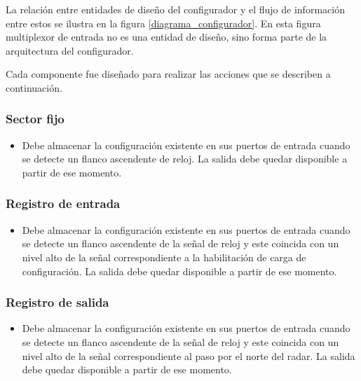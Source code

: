 La relación entre entidades de diseño del configurador y el flujo de información entre estos se ilustra en la figura \ref{diagrama_configurador}. En esta figura multiplexor de entrada no es una entidad de diseño, sino forma parte de la arquitectura del configurador.

Cada componente fue diseñado para realizar las acciones que se describen a continuación.

\subsubsection{Sector fijo}
\begin{itemize}
\item Debe almacenar la configuración existente en sus puertos de entrada cuando se detecte un flanco ascendente de reloj. La salida debe quedar disponible a partir de ese momento.
\end{itemize}

\subsubsection{Registro de entrada}
\begin{itemize}
\item Debe almacenar la configuración existente en sus puertos de entrada cuando se detecte un flanco ascendente de la señal de reloj y este coincida con un nivel alto de la señal correspondiente a la habilitación de carga de configuración. La salida debe quedar disponible a partir de ese momento.
\end{itemize}

\subsubsection{Registro de salida}
\begin{itemize}
\item Debe almacenar la configuración existente en sus puertos de entrada cuando se detecte un flanco ascendente de la señal de reloj y este coincida con un nivel alto de la señal correspondiente al paso por el norte del radar. La salida debe quedar disponible a partir de ese momento.
\end{itemize}

